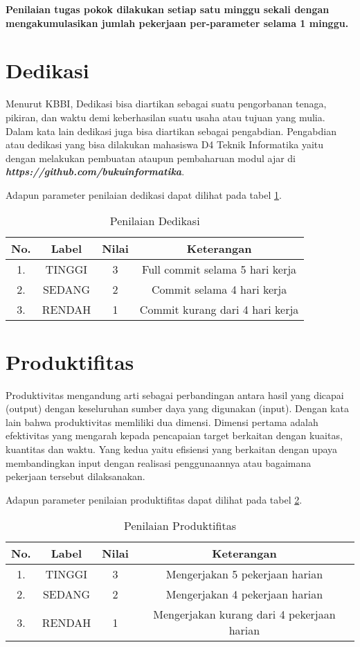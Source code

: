 \textbf{Penilaian tugas pokok dilakukan setiap satu minggu sekali dengan mengakumulasikan jumlah pekerjaan per-parameter selama 1 minggu.}

\section{Dedikasi}

Menurut KBBI, Dedikasi bisa diartikan sebagai suatu pengorbanan tenaga, pikiran, dan waktu demi keberhasilan suatu usaha atau tujuan yang mulia. Dalam kata lain dedikasi juga bisa diartikan sebagai pengabdian. Pengabdian atau dedikasi yang bisa dilakukan mahasiswa D4 Teknik Informatika yaitu dengan melakukan pembuatan ataupun pembaharuan modul ajar di \textbf{\textit{https://github.com/bukuinformatika}}.

Adapun parameter penilaian dedikasi dapat dilihat pada tabel \ref{tab:nilaidedikasi}.

\begin{table}[h]
\caption{Penilaian Dedikasi}
\centering
\begin{tabular}{|c|c|c|c|}
\hline
\textbf{No.}&\textbf{Label}&\textbf{Nilai}&\textbf{Keterangan}\\
\hline
1.&TINGGI&3&Full commit selama 5 hari kerja\\
\hline
2.&SEDANG&2&Commit selama 4 hari kerja\\
\hline
3.&RENDAH&1&Commit kurang dari 4 hari kerja\\
\hline
\end{tabular}
\label{tab:nilaidedikasi}
\end{table}

\section{Produktifitas}
Produktivitas mengandung arti sebagai perbandingan antara hasil yang dicapai (output) dengan keseluruhan sumber daya yang digunakan (input). Dengan kata lain bahwa produktivitas memliliki dua dimensi. Dimensi pertama adalah efektivitas yang mengarah kepada pencapaian target berkaitan dengan kuaitas, kuantitas dan waktu. Yang kedua yaitu efisiensi yang berkaitan dengan upaya membandingkan input dengan realisasi penggunaannya atau bagaimana pekerjaan tersebut dilaksanakan.

Adapun parameter penilaian produktifitas dapat dilihat pada tabel \ref{tab:nilaiproduktifitas}.

\begin{table}[h]
\caption{Penilaian Produktifitas}
\centering
\begin{tabular}{|c|c|c|c|}
\hline
\textbf{No.}&\textbf{Label}&\textbf{Nilai}&\textbf{Keterangan}\\
\hline
1.&TINGGI&3&Mengerjakan 5 pekerjaan harian\\
\hline
2.&SEDANG&2&Mengerjakan 4 pekerjaan harian\\
\hline
3.&RENDAH&1&Mengerjakan kurang dari 4 pekerjaan harian\\
\hline
\end{tabular}
\label{tab:nilaiproduktifitas}
\end{table}


